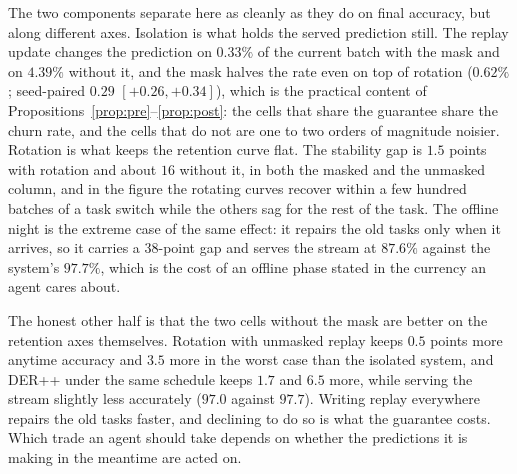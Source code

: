 \documentclass{article}
\begin{document}
The two components separate here as cleanly as they do on final accuracy, but along
different axes. Isolation is what holds the served prediction still. The replay update
changes the prediction on $0.33\%$ of the current batch with the mask and on $4.39\%$
without it, and the mask halves the rate even on top of rotation ($0.62\%$; seed-paired
$0.29$ $[+0.26,+0.34]$), which is the practical content of
Propositions~\ref{prop:pre}--\ref{prop:post}: the cells that share the guarantee share the
churn rate, and the cells that do not are one to two orders of magnitude noisier. Rotation
is what keeps the retention curve flat. The stability gap is $1.5$ points with rotation and
about $16$ without it, in both the masked and the unmasked column, and in the figure the
rotating curves recover within a few hundred batches of a task switch while the others sag
for the rest of the task. The offline night is the extreme case of the same effect: it
repairs the old tasks only when it arrives, so it carries a $38$-point gap and serves the
stream at $87.6\%$ against the system's $97.7\%$, which is the cost of an offline phase
stated in the currency an agent cares about.

The honest other half is that the two cells without the mask are better on the retention
axes themselves. Rotation with unmasked replay keeps $0.5$ points more anytime accuracy and
$3.5$ more in the worst case than the isolated system, and DER++ under the same schedule
keeps $1.7$ and $6.5$ more, while serving the stream slightly less accurately ($97.0$
against $97.7$). Writing replay everywhere repairs the old tasks faster, and declining to
do so is what the guarantee costs. Which trade an agent should take depends on whether the
predictions it is making in the meantime are acted on.
\end{document}
